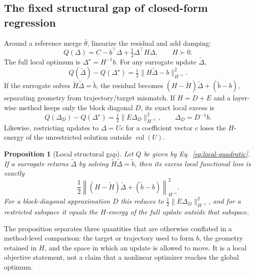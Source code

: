 \documentclass[letterpaper]{article} %
\theoremstyle{plain}
\newtheorem{proposition}[theorem]{Proposition}
\theoremstyle{definition}
\begin{document}
\subsection{The fixed structural gap of closed-form regression}
\label{sec:closed-form-gap}

Around a reference merge $\bar\theta$, linearize the residual and add damping:
\begin{equation}
Q(\Delta)=C-b^\top\Delta+\tfrac12\Delta^\top H\Delta,
\qquad H\succ0.
\label{eq:local-quadratic}
\end{equation}
The full local optimum is $\Delta^\star=H^{-1}b$.
For any surrogate update $\widetilde\Delta$,
\begin{equation}
Q(\widetilde\Delta)-Q(\Delta^\star)
=\tfrac12\|H\widetilde\Delta-b\|_{H^{-1}}^2.
\label{eq:gap-main}
\end{equation}
If the surrogate solves $\widetilde H\widetilde\Delta=\widetilde b$, the residual becomes $(H-\widetilde H)\widetilde\Delta+(\widetilde b-b)$, separating geometry from trajectory/target mismatch.
If $H=D+E$ and a layer-wise method keeps only the block diagonal $D$, its exact local excess is
\begin{equation}
Q(\Delta_D)-Q(\Delta^\star)
=\tfrac12\|E\Delta_D\|_{H^{-1}}^2,
\qquad \Delta_D=D^{-1}b.
\label{eq:cross-layer-gap-main}
\end{equation}
Likewise, restricting updates to $\Delta=Uc$ for a coefficient vector $c$ loses the $H$-energy of the unrestricted solution outside $\operatorname{col}(U)$.

\begin{proposition}[Local structural gap]
\label{prop:local-gap-main}
Let $Q$ be given by Eq.~\eqref{eq:local-quadratic}.
If a surrogate returns $\widetilde\Delta$ by solving $\widetilde H\widetilde\Delta=\widetilde b$, then its excess local functional loss is exactly \[ \frac12\left\|(H-\widetilde H)\widetilde\Delta+(\widetilde b-b)\right\|_{H^{-1}}^2.
\] For a block-diagonal approximation $D$ this reduces to $\tfrac12\|E\Delta_D\|_{H^{-1}}^2$, and for a restricted subspace it equals the $H$-energy of the full update outside that subspace.
\end{proposition}

The proposition separates three quantities that are otherwise conflated in a method-level comparison: the target or trajectory used to form $b$, the geometry retained in $H$, and the space in which an update is allowed to move.
It is a local objective statement, not a claim that a nonlinear optimizer reaches the global optimum.
\end{document}
